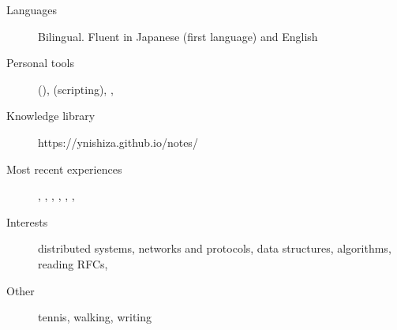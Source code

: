 \begin{description}
  \liststyle
  \item[Languages]{Bilingual. Fluent in Japanese (first language) and English}
  \item[Personal tools]{\rfneovim (\rfvim), \rfbash (scripting), \rfgit, \rftmux }
  \item[Knowledge library]{https://ynishiza.github.io/notes/}
  \item[Most recent experiences]{\rfnodejs, \rfmongodb, \rfredis, \rfneofj, \rfdocker, \rfreact, \rfcypress  }
  \item[Interests]{distributed systems, networks and protocols, data structures, algorithms, reading RFCs, \rfhaskell }
  \item[Other]{tennis, walking, writing}
\end{description}

